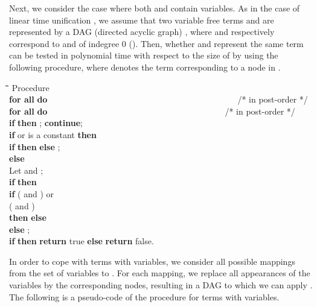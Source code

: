 \documentclass[a4paper]{llncs}
\begin{document}
Next, we consider the case where both  and  contain variables.
As in the case of linear time unification \cite{paterson78},
we assume that two variable free terms  and 
are represented by a DAG (directed acyclic graph) ,
where  and  respectively correspond to  and  
of indegree 0 ().
Then, whether  and  represent the same term can be tested 
in polynomial time with respect to the size of 
by using the following procedure, where  denotes the term
corresponding to a node  in .

\begin{rm}
\begin{tabbing}
\quad \= \quad \= \quad \= \quad \= \quad \= \quad \= \quad \= \quad \= \quad \= \kill
\> Procedure \\
\> \> {\bf for all}  {\bf do}~~~~~~~~~~~~~~~~~~~~~~~~~~~~~~~~~~~~~~~~~~~~~/* in post-order */\\
\> \> \> {\bf for all}  {\bf do}~~~~~~~~~~~~~~~~~~~~~~~~~~~~~~~~~~~~~~~~~~/* in post-order */\\
\> \> \> \> {\bf if}  {\bf then} ; {\bf continue};\\
\> \> \> \> {\bf if}  or  is a constant {\bf then} \\
\> \> \> \> \> {\bf if}  {\bf then}  {\bf else} ;\\
\> \> \> \> {\bf else}\\
\> \> \> \> \> Let  and ; \\
\> \> \> \> \> {\bf if}  {\bf then}\\
\> \> \> \> \> \> {\bf if} ( and ) or \\
\> \> \> \> \> \> \> \> \> ( and ) \\
\> \> \> \> \> \> {\bf then}  {\bf else} \\
\> \> \> \> \> {\bf else} ;\\
\> \> {\bf if}  {\bf then} {\bf return} true {\bf else} {\bf return} false.
\end{tabbing}
\end{rm}

In order to cope with terms with variables,
we consider all possible mappings from the set of variables to
.
For each mapping,
we replace all appearances of the variables by the corresponding nodes,
resulting in a DAG to which we can apply .
The following is a pseudo-code of the procedure for terms with variables.
\end{document}

